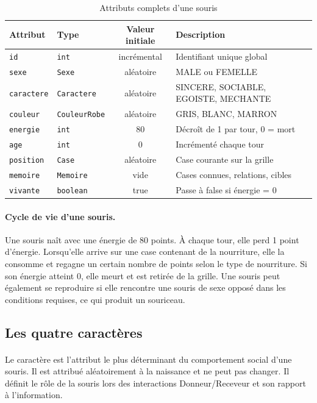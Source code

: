 \begin{table}[h!]
\centering
\renewcommand{\arraystretch}{1.4}
\begin{tabular}{|l|l|c|p{5.5cm}|}
\hline
\textbf{Attribut} & \textbf{Type} & \textbf{Valeur initiale} & \textbf{Description} \\
\hline
\texttt{id} & \texttt{int} & incrémental & Identifiant unique global \\
\texttt{sexe} & \texttt{Sexe} & aléatoire & MALE ou FEMELLE \\
\texttt{caractere} & \texttt{Caractere} & aléatoire & SINCERE, SOCIABLE, EGOISTE, MECHANTE \\
\texttt{couleur} & \texttt{CouleurRobe} & aléatoire & GRIS, BLANC, MARRON \\
\texttt{energie} & \texttt{int} & 80 & Décroît de 1 par tour, 0 = mort \\
\texttt{age} & \texttt{int} & 0 & Incrémenté chaque tour \\
\texttt{position} & \texttt{Case} & aléatoire & Case courante sur la grille \\
\texttt{memoire} & \texttt{Memoire} & vide & Cases connues, relations, cibles \\
\texttt{vivante} & \texttt{boolean} & true & Passe à false si énergie = 0 \\
\hline
\end{tabular}
\caption{Attributs complets d'une souris}
\label{tab:souris_attrs}
\end{table}

\paragraph{Cycle de vie d'une souris.} Une souris naît avec une énergie de 80 points. À chaque tour, elle perd 1 point d'énergie. Lorsqu'elle arrive sur une case contenant de la nourriture, elle la consomme et regagne un certain nombre de points selon le type de nourriture. Si son énergie atteint 0, elle meurt et est retirée de la grille. Une souris peut également se reproduire si elle rencontre une souris de sexe opposé dans les conditions requises, ce qui produit un souriceau.

\bigskip

\subsection{Les quatre caractères}

\paragraph{} Le caractère est l'attribut le plus déterminant du comportement social d'une souris. Il est attribué aléatoirement à la naissance et ne peut pas changer. Il définit le rôle de la souris lors des interactions Donneur/Receveur et son rapport à l'information.

